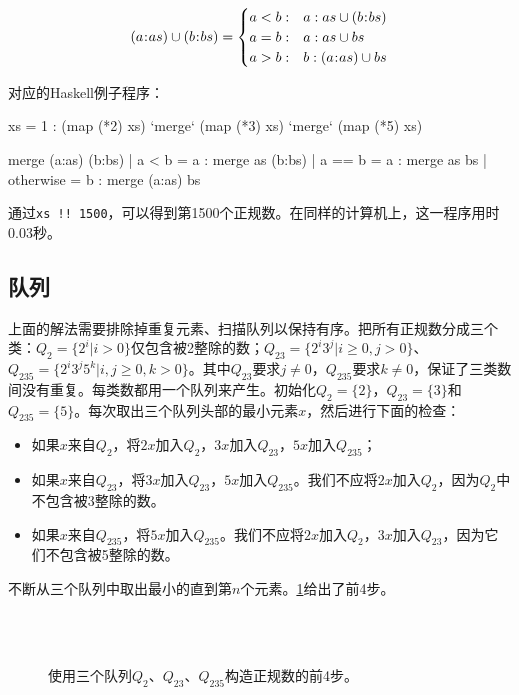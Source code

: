\documentclass[b5paper]{ctexart}
\begin{document}
\[
(a \cons as) \cup (b \cons bs) = \begin{cases}
  a < b: & a : as \cup (b \cons bs) \\
  a = b: & a : as \cup bs \\
  a > b: & b : (a \cons as) \cup bs \\
\end{cases}
\]

对应的Haskell例子程序：
\begin{Haskell}
xs = 1 : (map (*2) xs) `merge` (map (*3) xs) `merge` (map (*5) xs)

merge (a:as) (b:bs) | a < b = a : merge as (b:bs)
                    | a == b = a : merge as bs
                    | otherwise = b : merge (a:as) bs
\end{Haskell}

通过\texttt{xs !! 1500}，可以得到第1500个正规数。在同样的计算机上，这一程序用时0.03秒。

\subsection*{队列}
上面的解法需要排除掉重复元素、扫描队列以保持有序。把所有正规数分成三个类：$Q_2 = \{2^i | i > 0\}$仅包含被2整除的数；$Q_{23} = \{ 2^i3^j | i \geq 0, j > 0 \}$、$Q_{235} = \{ 2^i3^j5^k | i,j \geq 0, k > 0\}$。其中$Q_{23}$要求$j \neq 0$，$Q_{235}$要求$k \neq 0$，保证了三类数间没有重复。每类数都用一个队列来产生。初始化$Q_2=\{ 2 \}$，$Q_{23} = \{ 3 \}$和$Q_{235} = \{ 5 \}$。每次取出三个队列头部的最小元素$x$，然后进行下面的检查：

\begin{itemize}
\item 如果$x$来自$Q_2$，将$2x$加入$Q_2$，$3x$加入$Q_{23}$，$5x$加入$Q_{235}$；
\item 如果$x$来自$Q_{23}$，将$3x$加入$Q_{23}$，$5x$加入$Q_{235}$。我们不应将$2x$加入$Q_2$，因为$Q_2$中不包含被3整除的数。
\item 如果$x$来自$Q_{235}$，将$5x$加入$Q_{235}$。我们不应将$2x$加入$Q_2$，$3x$加入$Q_{23}$，因为它们不包含被5整除的数。
\end{itemize}

不断从三个队列中取出最小的直到第$n$个元素。\cref{fig:q235}给出了前4步。

\begin{figure}[htbp]
  \centering
   \\
   \\
  \caption{使用三个队列$Q_2$、$Q_{23}$、$Q_{235}$构造正规数的前4步。}
  \label{fig:q235}
\end{figure}
\end{document}
